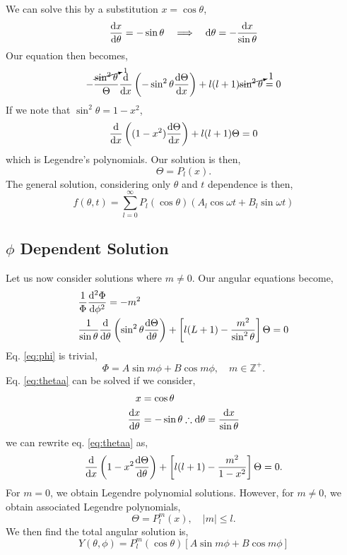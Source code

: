 \documentclass{book}
\begin{document}
We can solve this by a substitution $x = \cos\theta$,
\begin{align}
	\dv{x}{\theta} =-\sin\theta && \implies && \dd{\theta} = - \frac{\dd{x}}{\sin\theta}
\end{align}
Our equation then becomes,
\begin{equation}
	-\frac{\cancelto{1}{\sin^2\theta}}{\Theta}\dv{x}\left(-\sin^2\theta \dv{\Theta}{x}\right) + l(l+1)\cancelto{1}{\sin^2\theta} = 0
\end{equation}
If we note that $\sin^2\theta = 1 - x^2$,
\begin{equation}
	\dv{x}\left((1-x^2)\dv{\Theta}{x}\right) + l(l+1)\Theta = 0
\end{equation}
which is Legendre's polynomials. Our solution is then,
\begin{equation}
	\Theta = P_{l}(x).
\end{equation}
The general solution, considering only $\theta$ and $t$ dependence is then,
\begin{equation}
	f(\theta, t) = \sum_{l=0}^{\infty}P_l(\cos\theta)\left(A_l\cos\omega t + B_l\sin\omega t\right)
\end{equation}
\subsection{$\phi$ Dependent Solution}
Let us now consider solutions where $m\neq 0$. Our angular equations become,
\begin{align}
	&\frac{1}{\Phi}\dv[2]{\Phi}{\phi} = -m^2 \label{eq:phi} \\
	&\frac{1}{\sin\theta} \dv{\theta}\left(\sin^2\theta \dv{\Theta}{\theta}\right) + \left[l(L +1)- \frac{m^2}{\sin^2\theta}\right]\Theta = 0  \label{eq:thetaa}
\end{align}
Eq. \eqref{eq:phi} is trivial,
\begin{equation}
	\Phi = A \sin m \phi + B \cos m \phi, \hspace{1em} m \in \mathbb{Z}^+.
\end{equation}
Eq. \eqref{eq:thetaa} can be solved if we consider,
\begin{align}
	x & = \cos\theta \\
	\dv{x}{\theta} & = -\sin \theta \therefore \dd{\theta} = \frac{\dd{x}}{\sin\theta}
\end{align}
we can rewrite eq. \eqref{eq:thetaa} as,
\begin{equation}
	\dv{x}\left(1 - x^2\dv{\Theta}{\theta}\right) + \left[l(l+1) - \frac{m^2}{1-x^2}\right]\Theta = 0.
\end{equation}
For $m=0$, we obtain Legendre polynomial solutions. However, for $m\neq0$, we obtain associated Legendre polynomials,
\begin{equation}
	\Theta = P_l^m(x), \hspace{1em} |m| \leq l.
\end{equation}
We then find the total angular solution is,
\begin{equation}
	Y(\theta, \phi) = P_l^m(\cos\theta)\left[A \sin m \phi + B \cos m \phi\right]
\end{equation}
\end{document}
